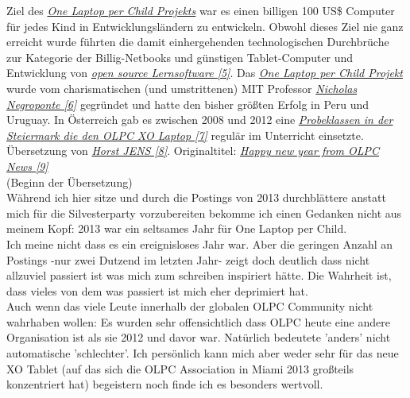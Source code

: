 \documentclass[10pt,a4paper,ngerman,twoside]{article} %
\begin{document}
\begin{multicols}{3}
Ziel des \href{http://one.laptop.org/}{\textit{One Laptop per Child Projekts}} war es einen billigen 100 US\$ Computer für jedes Kind in Entwicklungsländern zu entwickeln. Obwohl dieses Ziel nie ganz erreicht wurde führten die damit einhergehenden technologischen Durchbrüche zur Kategorie der Billig-Netbooks und günstigen Tablet-Computer und Entwicklung von \href{https://en.wikipedia.org/wiki/Sugar_(desktop_environment)}{\textit{open source Lernsoftware [5]}}. Das \href{http://one.laptop.org/}{\textit{One Laptop per Child Projekt}} wurde vom charismatischen (und umstrittenen) MIT Professor \href{https://de.wikipedia.org/wiki/Nicholas_Negroponte}{\textit{Nicholas Negroponte [6]}} gegründet und hatte den bisher größten Erfolg in Peru und Uruguay. In Österreich gab es zwischen 2008 und 2012 eine \href{http://www.fuzo-archiv.at/artikel/1503081v2}{\textit{Probeklassen in der Steiermark die den OLPC XO Laptop [7]}} regulär im Unterricht einsetzte. \\

Übersetzung von \href{http://spielend-programmieren.at}{\textit{Horst JENS [8]}}. Originaltitel: \href{http://www.olpcnews.com/commentary/olpc_news/happy_new_year_from_olpc_news.html}{\textit{Happy new year from OLPC News [9]}} \\

(Beginn der Übersetzung) \\

Während ich hier sitze und durch die Postings von 2013 durchblättere anstatt mich für die Silvesterparty vorzubereiten bekomme ich einen Gedanken nicht aus meinem Kopf: 2013 war ein seltsames Jahr für One Laptop per Child. \\

Ich meine nicht dass es ein ereignisloses Jahr war. Aber die geringen Anzahl an Postings -nur zwei Dutzend im letzten Jahr- zeigt doch deutlich dass nicht allzuviel passiert ist was mich zum schreiben inspiriert hätte. Die Wahrheit ist, dass vieles von dem was passiert ist mich eher deprimiert hat. \\

Auch wenn das viele Leute innerhalb der globalen OLPC Community nicht wahrhaben wollen: Es wurden sehr offensichtlich dass OLPC heute eine andere Organisation ist als sie 2012 und davor war. Natürlich bedeutete 'anders' nicht automatische 'schlechter'. Ich persönlich kann mich aber weder sehr für das neue XO Tablet (auf das sich die OLPC Association in Miami 2013 großteils konzentriert hat) begeistern noch finde ich es besonders wertvoll. \\


\end{multicols}
\end{document}
